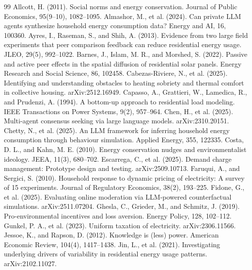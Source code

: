 \documentclass[11pt]{article}
\begin{document}
\begin{thebibliography}{99}
\small
{} Allcott, H. (2011). Social norms and energy conservation. Journal of Public Economics, 95(9--10), 1082--1095.
 Almashor, M., et al. (2024). Can private LLM agents synthesize household energy consumption data? Energy and AI, 16, 100360.
 Ayres, I., Raseman, S., and Shih, A. (2013). Evidence from two large field experiments that peer comparison feedback can reduce residential energy usage. JLEO, 29(5), 992--1022.
 Barnes, J., Islam, M. R., and Morshed, S. (2022). Passive and active peer effects in the spatial diffusion of residential solar panels. Energy Research and Social Science, 86, 102458.
 Cabezas-Riviere, N., et al. (2025). Identifying and understanding obstacles to heating sobriety and thermal comfort in collective housing. arXiv:2512.16949.
 Capasso, A., Grattieri, W., Lamedica, R., and Prudenzi, A. (1994). A bottom-up approach to residential load modeling. IEEE Transactions on Power Systems, 9(2), 957--964.
 Chen, H., et al. (2025). Multi-agent consensus seeking via large language models. arXiv:2310.20151.
 Chetty, N., et al. (2025). An LLM framework for inferring household energy consumption through behaviour simulation. Applied Energy, 355, 122335.
 Costa, D. L., and Kahn, M. E. (2010). Energy conservation nudges and environmentalist ideology. JEEA, 11(3), 680--702.
 Escarrega, C., et al. (2025). Demand charge management: Prototype design and testing. arXiv:2509.10713.
 Faruqui, A., and Sergici, S. (2010). Household response to dynamic pricing of electricity: A survey of 15 experiments. Journal of Regulatory Economics, 38(2), 193--225.
 Fidone, G., et al. (2025). Evaluating online moderation via LLM-powered counterfactual simulations. arXiv:2511.07204.
 Ghesla, C., Grieder, M., and Schmitz, J. (2019). Pro-environmental incentives and loss aversion. Energy Policy, 128, 102--112.
 Gunkel, P. A., et al. (2023). Uniform taxation of electricity. arXiv:2306.11566.
 Jessoe, K., and Rapson, D. (2012). Knowledge is (less) power. American Economic Review, 104(4), 1417--1438.
 Jin, L., et al. (2021). Investigating underlying drivers of variability in residential energy usage patterns. arXiv:2102.11027.

\end{thebibliography}
\end{document}
